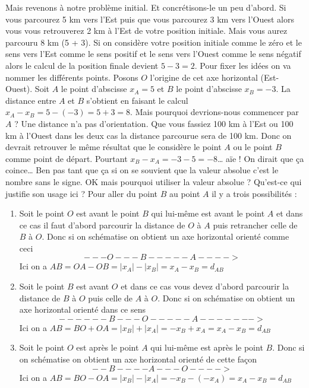 \documentclass[a4paper, 11pt, twoside]{book}
\begin{document}
Mais revenons à notre problème initial. Et concrétisons-le un peu
d'abord. Si vous parcourez 5 km vers l'Est puis que vous parcourez
3 km vers l'Ouest alors vous vous retrouverez 2 km à l'Est de votre
position initiale. Mais vous aurez parcouru 8 km (5 + 3). Si on
considère votre position initiale comme le zéro et le sens vers
l'Est comme le sens positif et le sens vers l'Ouest comme le sens
négatif alors le calcul de la position finale devient \(5 - 3 =
   2\). Pour fixer les idées on va nommer les différents points. Posons
\(O\) l'origine de cet axe horizontal (Est-Ouest). Soit \(A\) le point
d'abscisse \(x_A = 5\) et \(B\) le point d'abscisse \(x_B = -3\). La
distance entre \(A\) et \(B\) s'obtient en faisant le calcul \(x_A - x_B
   = 5 - (-3) = 5 + 3 = 8\). Mais pourquoi devrions-nous commencer par
\(A\) ? Une distance n'a pas d'orientation. Que vous fassiez 100 km à
l'Est ou 100 km à l'Ouest dans les deux cas la distance parcourue
sera de 100 km. Donc on devrait retrouver le même résultat que le
considère le point \(A\) ou le point \(B\) comme point de
départ. Pourtant \(x_B - x_A = -3 - 5 = -8\)\ldots{} aïe ! On dirait que
ça coince\ldots{} Ben pas tant que ça si on se souvient que la valeur
absolue c'est le nombre sans le signe. OK mais pourquoi utiliser la
valeur absolue ? Qu'est-ce qui justifie son usage ici ? Pour aller
du point \(B\) au point \(A\) il y a trois possibilités :
\begin{enumerate}
\item Soit le point \(O\) est avant le point \(B\) qui lui-même est avant
le point \(A\) et dans ce cas il faut d'abord parcourir la
distance de \(O\) à \(A\) puis retrancher celle de \(B\) à \(O\). Donc
si on schématise on obtient un axe horizontal orienté comme ceci
\[---O---B-----A---->\]
Ici on a \(AB = OA - OB = |x_A| - |x_B| = x_A - x_B = d_{AB}\)
\item Soit le point \(B\) est avant \(O\) et dans ce cas vous devez
d'abord parcourir la distance de \(B\) à \(O\) puis celle de \(A\) à
\(O\). Donc si on schématise on obtient un axe horizontal orienté
dans ce sens \[------B---O-----A------->\]
Ici on a \(AB = BO + OA = \lvert x_B \rvert + \lvert x_A \rvert =
      -x_B + x_A = x_A - x_B = d_{AB}\)
\item Soit le point \(O\) est après le point \(A\) qui lui-même est après
le point \(B\). Donc si on schématise on obtient un axe horizontal
orienté de cette façon \[--B----A---O---->\]
Ici on a \(AB = BO - OA = |x_B| - |x_A| = -x_B - (-x_A) = x_A -
      x_B = d_{AB}\)
\end{enumerate}
\end{document}
